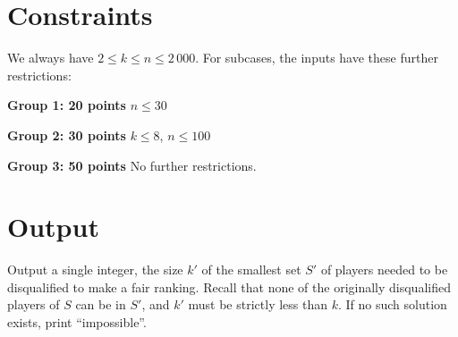 \section*{Constraints}
We always have $2 \leq k \leq n \leq 2\,000$. For subcases, the inputs have these further restrictions:

\begin{description}
    \item{\textbf{Group 1: 20 points}} $n \leq 30$ %
    \item{\textbf{Group 2: 30 points}} $k \leq 8$, $n \leq 100$ %
    \item{\textbf{Group 3: 50 points}} No further restrictions.
\end{description}


\section*{Output}
Output a single integer, the size $k'$ of the smallest set $S'$ of players needed to be disqualified to make a fair ranking. Recall that none of the originally disqualified players of $S$ can be in $S'$, and $k'$ must be strictly less than $k$. If no such solution exists, print ``impossible''.


